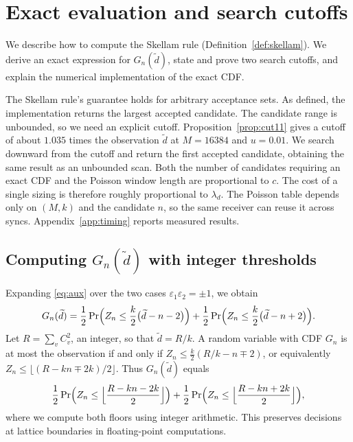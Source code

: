 \section{Exact evaluation and search cutoffs}\label{app:search}
We describe how to compute the Skellam rule (Definition~\ref{def:skellam}). We derive an exact expression for $G_n(\widetilde d)$, state and prove two search cutoffs, and explain the numerical implementation of the exact CDF.

The Skellam rule's guarantee holds for arbitrary acceptance sets. As defined, the implementation returns the largest accepted candidate. The candidate range is unbounded, so we need an explicit cutoff. Proposition~\ref{prop:cut11} gives a cutoff of about $1.035$ times the observation $\widetilde d$ at $M=16384$ and $u=0.01$. We search downward from the cutoff and return the first accepted candidate, obtaining the same result as an unbounded scan. Both the number of candidates requiring an exact CDF and the Poisson window length are proportional to $c$. The cost of a single sizing is therefore roughly proportional to $\lambda_d$. The Poisson table depends only on $(M,k)$ and the candidate $n$, so the same receiver can reuse it across syncs. Appendix~\ref{app:timing} reports measured results.

\subsection{\texorpdfstring{Computing $G_n(\widetilde d)$ with integer thresholds}{Computing G_n with integer thresholds}}
Expanding \eqref{eq:aux} over the two cases $\varepsilon_1\varepsilon_2=\pm1$, we obtain
\begin{equation*}
G_n(\widetilde d)=\frac12\Pr\Bigl(Z_n\le\frac k2\bigl(\widetilde d-n-2\bigr)\Bigr)+\frac12\Pr\Bigl(Z_n\le\frac k2\bigl(\widetilde d-n+2\bigr)\Bigr).
\end{equation*}
Let $R=\sum_vC_v^2$, an integer, so that $\widetilde d=R/k$. A random variable with CDF $G_n$ is at most the observation if and only if $Z_n\le\frac k2(R/k-n\mp2)$, or equivalently $Z_n\le\lfloor(R-kn\mp2k)/2\rfloor$. Thus $G_n(\widetilde d)$ equals
\begin{equation*}
\frac12\Pr\Bigl(Z_n\le\Bigl\lfloor\frac{R-kn-2k}2\Bigr\rfloor\Bigr)+\frac12\Pr\Bigl(Z_n\le\Bigl\lfloor\frac{R-kn+2k}2\Bigr\rfloor\Bigr),
\end{equation*}
where we compute both floors using integer arithmetic. This preserves decisions at lattice boundaries in floating-point computations.

